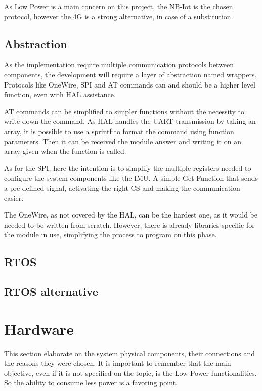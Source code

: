 As Low Power is a main concern on this project, the NB-Iot is the chosen protocol, 
however the 4G is a strong alternative, in case of a substitution.
\subsection{Abstraction}

As the implementation require multiple communication protocols between components,
the development will require a layer of abstraction named wrappers. Protocols like OneWire, SPI and AT 
commands can and should be a higher level function, even with HAL assistance.

AT commands can be simplified to simpler functions without the necessity to write down
the command. As HAL handles the UART transmission by taking an array, it is possible to
use a sprintf to format the command using function parameters. Then it can be received 
the module answer and writing it on an array given when the function is called. 

As for the SPI, here the intention is to simplify the multiple registers needed to 
configure the system components like the IMU. A simple Get Function that sends a 
pre-defined signal, activating the right CS and making the communication easier.

The OneWire, as not covered by the HAL, can be the hardest one, as it would be needed
to be written from scratch. However, there is already libraries specific for the 
module in use, simplifying the process to program on this phase. 

\subsection{RTOS}
\subsection{RTOS alternative}

\section{Hardware}

This section elaborate on the system physical components, their connections and the 
reasons they were chosen. It is important to remember that the main objective, even if 
it is not specified on the topic, is the Low Power functionalities. So the ability to
consume less power is a favoring point. 


